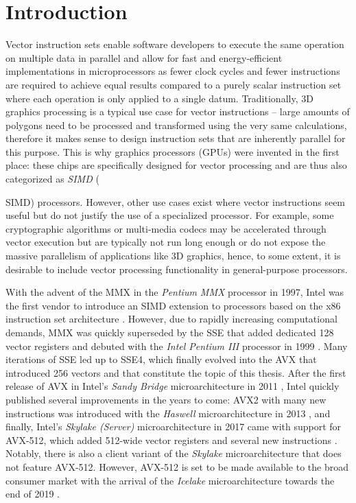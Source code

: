 \chapter{Introduction}
\label{sec:introduction}

Vector instruction sets enable software developers to execute the same operation on multiple data in parallel and allow for fast and energy-efficient implementations in microprocessors as fewer clock cycles and fewer instructions are required to achieve equal results compared to a purely scalar instruction set where each operation is only applied to a single datum. Traditionally, 3D graphics processing is a typical use case for vector instructions -- large amounts of polygons need to be processed and transformed using the very same calculations, therefore it makes sense to design instruction sets that are inherently parallel for this purpose. This is why graphics processors (\glspl{GPU}) were invented in the first place: these chips are specifically designed for vector processing and are thus also categorized as \textit{\acrlong{SIMD}} ({\acrshort{SIMD}) processors. However, other use cases exist where vector instructions seem useful but do not justify the use of a specialized processor. For example, some cryptographic algorithms or multi-media codecs may be accelerated through vector execution but are typically not run long enough or do not expose the massive parallelism of applications like 3D graphics, hence, to some extent, it is desirable to include vector processing functionality in general-purpose processors.

With the advent of the \gls{MMX} in the \textit{Pentium MMX} processor in 1997, Intel was the first vendor to introduce an \gls{SIMD} extension to processors based on the \gls{x86} instruction set architecture \cite{intelmmx}. However, due to rapidly increasing computational demands, \gls{MMX} was quickly superseded by the \gls{SSE} that added dedicated \SI[number-unit-product=-]{128}{\bit} vector registers and debuted with the \textit{Intel Pentium III} processor in 1999 \cite{intelsse}. Many iterations of \gls{SSE} led up to SSE4, which finally evolved into the \gls{AVX} that introduced \SI[number-unit-product=-]{256}{\bit} vectors and that constitute the topic of this thesis. After the first release of \gls{AVX} in Intel's \textit{Sandy Bridge} microarchitecture in 2011 \cite{intelsandybridge}, Intel quickly published several improvements in the years to come: \gls{AVX2} with many new instructions was introduced with the \textit{Haswell} microarchitecture in 2013 \cite{hammarlund2014haswell}, and finally, Intel's \textit{Skylake (Server)} microarchitecture in 2017 came with support for \gls{AVX-512}, which added \SI[number-unit-product=-]{512}{\bit}-wide vector registers and several new instructions \cite{intelxeonscalabledeepdive}. Notably, there is also a client variant of the \textit{Skylake} microarchitecture that does not feature \gls{AVX-512}. However, \gls{AVX-512} is set to be made available to the broad consumer market with the arrival of the \textit{Icelake} microarchitecture towards the end of 2019 \cite{thicelake}.

}
